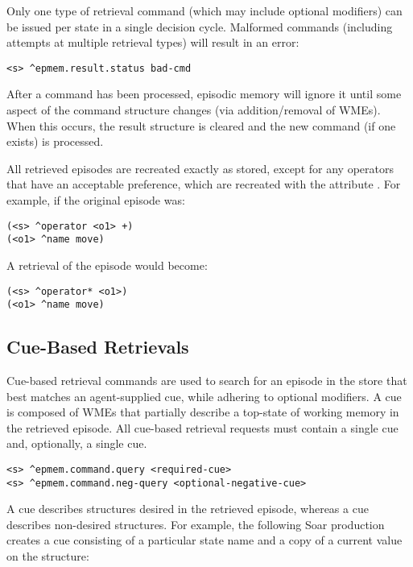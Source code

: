 Only one type of retrieval command (which may include optional modifiers) can be issued per state in a single decision cycle.
Malformed commands (including attempts at multiple retrieval types) will result in an error:

\begin{verbatim}
<s> ^epmem.result.status bad-cmd
\end{verbatim}

After a command has been processed, episodic memory will ignore it until some aspect of the command structure changes (via addition/removal of WMEs).
When this occurs, the result structure is cleared and the new command (if one exists) is processed.

All retrieved episodes are recreated exactly as stored, except for any operators that have an acceptable preference, which are recreated with the attribute .
For example, if the original episode was:

\begin{verbatim}
(<s> ^operator <o1> +)
(<o1> ^name move)
\end{verbatim}

A retrieval of the episode would become:

\begin{verbatim}
(<s> ^operator* <o1>)
(<o1> ^name move)
\end{verbatim}

\subsection{Cue-Based Retrievals}
Cue-based retrieval commands are used to search for an episode in the store that best matches an agent-supplied cue, while adhering to optional modifiers.
A cue is composed of WMEs that partially describe a top-state of working memory in the retrieved episode.
All cue-based retrieval requests must contain a single  cue and, optionally, a single  cue.

\begin{verbatim}
<s> ^epmem.command.query <required-cue>
<s> ^epmem.command.neg-query <optional-negative-cue>
\end{verbatim}

A  cue describes structures desired in the retrieved episode, whereas a  cue describes non-desired structures.
For example, the following Soar production creates a  cue consisting of a particular state name and a copy of a current value on the  structure:


